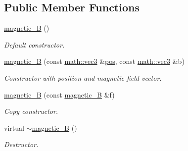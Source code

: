 \subsection*{Public Member Functions}
\begin{DoxyCompactItemize}
\item 
\mbox{\label{classphysim_1_1fields_1_1magnetic__B_ab5da6ab1de8e9724f61cad63fe21f374}} 
\hyperlink{classphysim_1_1fields_1_1magnetic__B_ab5da6ab1de8e9724f61cad63fe21f374}{magnetic\+\_\+B} ()
\begin{DoxyCompactList}\small\item\em Default constructor. \end{DoxyCompactList}\item 
\mbox{\label{classphysim_1_1fields_1_1magnetic__B_a5541b899c3f02a42b0aa67f4ec18c824}} 
\hyperlink{classphysim_1_1fields_1_1magnetic__B_a5541b899c3f02a42b0aa67f4ec18c824}{magnetic\+\_\+B} (const \hyperlink{structphysim_1_1math_1_1vec3}{math\+::vec3} \&\hyperlink{classphysim_1_1fields_1_1punctual_a00344d6f3e4f3f841e7d876918c66977}{pos}, const \hyperlink{structphysim_1_1math_1_1vec3}{math\+::vec3} \&b)
\begin{DoxyCompactList}\small\item\em Constructor with position and magnetic field vector. \end{DoxyCompactList}\item 
\mbox{\label{classphysim_1_1fields_1_1magnetic__B_ada69a69a5582e244210f10d8d1e69426}} 
\hyperlink{classphysim_1_1fields_1_1magnetic__B_ada69a69a5582e244210f10d8d1e69426}{magnetic\+\_\+B} (const \hyperlink{classphysim_1_1fields_1_1magnetic__B}{magnetic\+\_\+B} \&f)
\begin{DoxyCompactList}\small\item\em Copy constructor. \end{DoxyCompactList}\item 
\mbox{\label{classphysim_1_1fields_1_1magnetic__B_ab6e422ab8c678c67e447db13742f1180}} 
virtual \hyperlink{classphysim_1_1fields_1_1magnetic__B_ab6e422ab8c678c67e447db13742f1180}{$\sim$magnetic\+\_\+B} ()
\begin{DoxyCompactList}\small\item\em Destructor. \end{DoxyCompactList}\item 

\end{DoxyCompactItemize}
